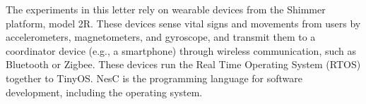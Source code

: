 The experiments in this letter rely on wearable devices from the Shimmer platform, model 2R. %
These devices sense vital signs and movements from users by accelerometers, magnetometers, and gyroscope, and transmit them to a coordinator device (e.g., a smartphone) through wireless communication, such as Bluetooth or Zigbee. These devices run the Real Time Operating System (RTOS) together to TinyOS. NesC is the programming language for software development, including the operating system.      
%
%
%
%
%
%


